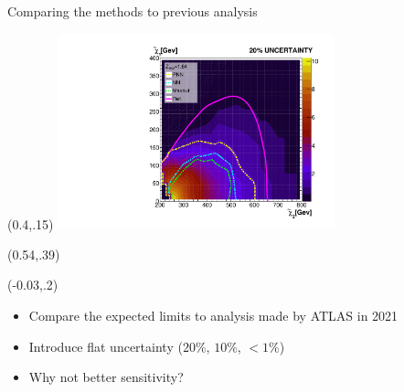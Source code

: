 \documentclass[UKenglish]{beamer}
\begin{document}
\begin{frame}{Comparing the methods to previous analysis}
    \begin{textblock}{1}(0.4,.15)
    \includegraphics[width=0.6\textwidth]{figures/Limits/compLimit20.pdf}
    \end{textblock}
    \begin{textblock}{1}(0.54,.39)
        \scriptsize
        \cite{atlas_search_2021}
    \end{textblock}
    \begin{textblock}{.45}(-0.03,.2)
    \begin{itemize}
        \item Compare the expected limits to analysis made by ATLAS in 2021 \cite{atlas_search_2021}
        \item Introduce flat uncertainty ($20\%$, $10\%$, $<1\%$) 
        \item Why not better sensitivity?
    \end{itemize}
\end{textblock}
\end{frame}
\end{document}
